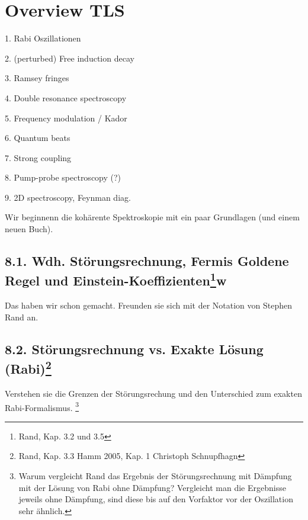 

\chapter{Overview TLS}





1.	Rabi Oszillationen

2.	(perturbed) Free induction decay

3.	Ramsey fringes

4.	Double resonance spectroscopy

5.	Frequency modulation / Kador

6.	Quantum beats

7.	Strong coupling 

8.	Pump-probe spectroscopy (?)

9.	2D spectroscopy, Feynman diag.





Wir beginnenn die kohärente Spektroskopie  mit ein paar
Grundlagen (und einem neuen Buch).

\section{8.1. Wdh. Störungsrechnung, Fermis Goldene Regel und
Einstein-Koeffizienten\protect\footnote{Rand, Kap. 3.2 und 3.5}\hfill w} 

Das haben wir schon gemacht. Freunden sie sich mit der
Notation von Stephen Rand an.

\section{8.2. Störungsrechnung vs. Exakte Lösung (Rabi)\protect\footnote{Rand, Kap. 3.3 \newline Hamm 2005, Kap. 1 \newline Christoph Schnupfhagn}\hfill *} 

Verstehen sie die Grenzen der Störungsrechung und den
Unterschied zum exakten Rabi-Formalismus. \footnote{Warum vergleicht Rand das Ergebnis der Störungsrechnung mit Dämpfung mit der Lösung von Rabi ohne Dämpfung? Vergleicht man die Ergebnisse jeweils ohne Dämpfung, sind diese bis auf den Vorfaktor vor der Oszillation sehr ähnlich.}

